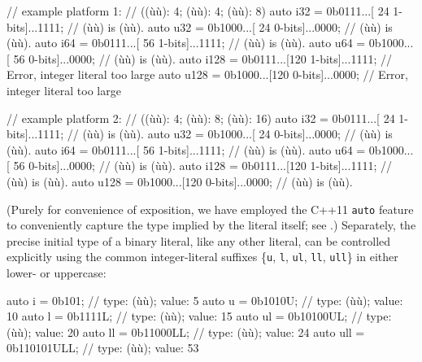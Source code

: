 \begin{emcppslisting}[emcppsignore={Invalid Descriptive Literals}]
// example platform 1:
// ((ù{}ù): 4; (ù{}ù): 4; (ù{}ù): 8)
auto i32  = 0b0111...[ 24 1-bits]...1111;  // (ù{}ù) is (ù{}ù).
auto u32  = 0b1000...[ 24 0-bits]...0000;  // (ù{}ù) is (ù{}ù).
auto i64  = 0b0111...[ 56 1-bits]...1111;  // (ù{}ù) is (ù{}ù).
auto u64  = 0b1000...[ 56 0-bits]...0000;  // (ù{}ù) is (ù{}ù).
auto i128 = 0b0111...[120 1-bits]...1111;  // Error, integer literal too large
auto u128 = 0b1000...[120 0-bits]...0000;  // Error, integer literal too large

// example platform 2:
// ((ù{}ù): 4; (ù{}ù): 8; (ù{}ù): 16)
auto i32  = 0b0111...[ 24 1-bits]...1111;  // (ù{}ù)  is (ù{}ù).
auto u32  = 0b1000...[ 24 0-bits]...0000;  // (ù{}ù)  is (ù{}ù).
auto i64  = 0b0111...[ 56 1-bits]...1111;  // (ù{}ù)  is (ù{}ù).
auto u64  = 0b1000...[ 56 0-bits]...0000;  // (ù{}ù)  is (ù{}ù).
auto i128 = 0b0111...[120 1-bits]...1111;  // (ù{}ù) is (ù{}ù).
auto u128 = 0b1000...[120 0-bits]...0000;  // (ù{}ù) is (ù{}ù).
\end{emcppslisting}


\noindent (Purely for convenience of
exposition, we have employed the C++11 \lstinline!auto! feature to
conveniently capture the type implied by the literal itself; see .) Separately, the precise initial type of a binary literal, like any other
literal, can be controlled explicitly using the common integer-literal
suffixes \{\lstinline!u!, \lstinline!l!, \lstinline!ul!, \lstinline!ll!,
\lstinline!ull!\} in either lower- or uppercase:

\begin{emcppslisting}
auto i   = 0b101;        // type: (ù{}ù);                 value: 5
auto u   = 0b1010U;      // type: (ù{}ù);        value: 10
auto l   = 0b1111L;      // type: (ù{}ù);                value: 15
auto ul  = 0b10100UL;    // type: (ù{}ù);       value: 20
auto ll  = 0b11000LL;    // type: (ù{}ù);           value: 24
auto ull = 0b110101ULL;  // type: (ù{}ù);  value: 53
\end{emcppslisting}


